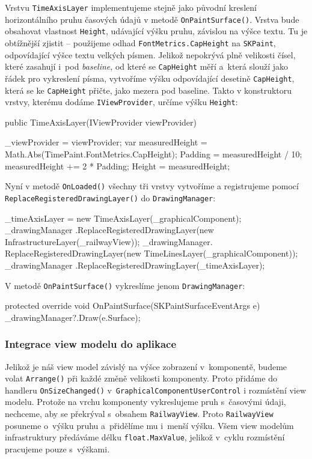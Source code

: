 Vrstvu \texttt{TimeAxisLayer} implementujeme stejně jako původní kreslení horizontálního pruhu časových údajů v metodě \texttt{OnPaintSurface()}. Vrstva bude obsahovat vlastnost \texttt{Height}, udávající výšku pruhu, závislou na výšce textu. Tu je obtížnější zjistit -- použijeme odhad \texttt{FontMetrics.CapHeight} na \texttt{SKPaint}, odpovídající výšce textu velkých písmen. Jelikož nepokrývá plně velikosti čísel, které zasahují i~pod \textit{baseline}, od které se \texttt{CapHeight} měří a~která slouží jako řádek pro vykreslení písma, vytvoříme výšku odpovídající desetině \texttt{CapHeight}, která se ke \texttt{CapHeight} přičte, jako mezera pod baseline. Takto v konstruktoru vrstvy, kterému dodáme \texttt{IViewProvider}, určíme výšku \texttt{Height}:

\begin{csharpcode}
public TimeAxisLayer(IViewProvider viewProvider) {

	_viewProvider = viewProvider;
	var measuredHeight = Math.Abs(TimePaint.FontMetrics.CapHeight);
	Padding = measuredHeight / 10;
	measuredHeight += 2 * Padding;
	Height = measuredHeight;
}
\end{csharpcode}

Nyní v metodě \texttt{OnLoaded()} všechny tři vrstvy vytvoříme a registrujeme pomocí \texttt{ReplaceRegisteredDrawingLayer()} do \texttt{DrawingManager}:

\begin{csharpcode}
_timeAxisLayer = new TimeAxisLayer(_graphicalComponent);
_drawingManager
  .ReplaceRegisteredDrawingLayer(new InfrastructureLayer(_railwayView));
_drawingManager.
  ReplaceRegisteredDrawingLayer(new TimeLinesLayer(_graphicalComponent));
_drawingManager
  .ReplaceRegisteredDrawingLayer(_timeAxisLayer);
\end{csharpcode}

V metodě \texttt{OnPaintSurface()} vykreslíme jenom \texttt{DrawingManager}:
\begin{csharpcode}
protected override void OnPaintSurface(SKPaintSurfaceEventArgs e) {
	_drawingManager?.Draw(e.Surface);
}
\end{csharpcode}

\subsubsection*{Integrace view modelu do aplikace}
Jelikož je náš view model závislý na výšce zobrazení v~komponentě, budeme volat \texttt{Arrange()} při každé změně velikosti komponenty. Proto přidáme do handleru \texttt{OnSizeChanged()} v~\texttt{GraphicalComponentUserControl} i rozmístění view modelu. Protože na vrchu komponenty vykreslujeme pruh s~časovými údaji, nechceme, aby se překrýval s~obsahem \texttt{RailwayView}. Proto \texttt{RailwayView} posuneme o~výšku pruhu a~přidělíme mu i~menší výšku. Všem view modelům infrastruktury předáváme délku \texttt{float.MaxValue}, jelikož v~cyklu rozmístění pracujeme pouze s~výškami.

